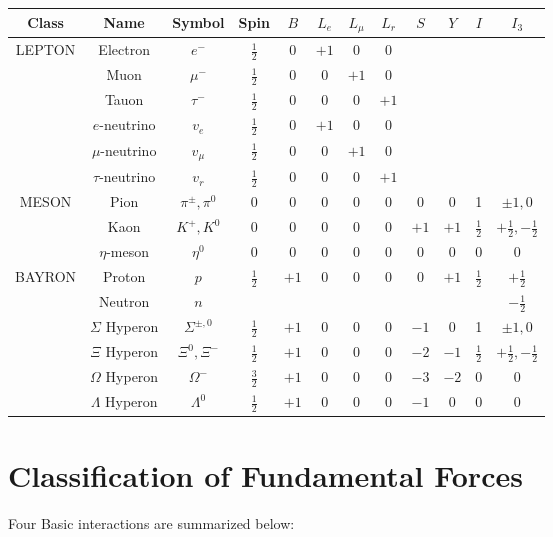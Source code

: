 \begin{tabular}{|c|c|c|c|c|c|c|c|c|c|c|c|}
	\hline
	Class & Name & Symbol & Spin & $B$ & $L_e$ & $L_\mu$ & $L_r$ & $S$ & $Y$ & $I$ & $I_3$	\\\hline
	\multirow{6}{*}{LEPTON}&Electron & $e^{-}$ & $\frac{1}{2}$ & 0 & $+1$ & 0 & 0&\multicolumn{4}{c|}{ }\\\cline{2-8}
	&Muon & $\mu^{-}$ & $\frac{1}{2}$ & 0 & 0 & $+1$ & 0 &\multicolumn{4}{c|}{ }\\\cline{2-8}
	 &Tauon & $\tau^{-}$ & $\frac{1}{2}$ & 0 & 0 & 0 & $+1$ &\multicolumn{4}{c|}{ }\\\cline{2-8}
	&$e$-neutrino & $v_e$ & $\frac{1}{2}$ & 0 & $+1$ & 0 & 0 &\multicolumn{4}{c|}{ }\\\cline{2-8}
	&$\mu$-neutrino & $v_{\mu }$ & $\frac{1}{2}$ & 0 & 0 & $+1$ & 0 &\multicolumn{4}{c|}{ }\\\cline{2-8}
	&$\tau$-neutrino & $v_r$ & $\frac{1}{2}$ & 0 & 0 & 0 & $+1$ &\multicolumn{4}{c|}{ }\\\hline
	\multirow{3}{*}{MESON}&Pion & $\pi^{\pm}, \pi^0$ & 0 & 0 & 0 & 0 & 0 & 0 & 0 & 1 & $\pm 1,0$ \\\cline{2-12}
	 &Kaon & $K^{+}, K^0$ & 0 & 0 & 0 & 0 & 0 & $+1$ & $+1$ & $\frac{1}{2}$ & $+\frac{1}{2},-\frac{1}{2}$ \\\cline{2-12}
	&$\eta$-meson & $\eta^0$ & 0 & 0 & 0 & 0 & 0 & 0 & 0 & 0 & 0 \\\hline
	\multirow{6}{*}{BAYRON}&Proton&$p$&\multirow{2}{*}{$\frac{1}{2}$}&\multirow{2}{*}{$+1$}& \multirow{2}{*}{0}&\multirow{2}{*}{0}&\multirow{2}{*}{0}&\multirow{2}{*}{0}&\multirow{2}{*}{$+1$}&\multirow{2}{*}{$\frac{1}{2}$} &        $+\frac{1}{2}$\\\cline{2-3}\cline{12-12}
	&Neutron&$n$& & & & & & & & &$-\frac{1}{2}$\\\cline{2-12}
	&$\Sigma$ Hyperon & $\Sigma^{\pm, 0}$ & $\frac{1}{2}$ & $+1$ & 0 & 0 & 0 & $-1$ & 0 & 1 & $\pm 1,0$ \\
	\cline{2-12}&$\Xi$ Hyperon & $\Xi^0, \Xi^{-}$ & $\frac{1}{2}$ & $+1$ & 0 & 0 & 0 & $-2$ & $-1$ & $\frac{1}{2}$ & $+\frac{1}{2},-\frac{1}{2}$ \\
	\cline{2-12}&$\Omega$ Hyperon & $\Omega^{-}$ & $\frac{3}{2}$ & $+1$ & 0 & 0 & 0 & $-3$ & $-2$ & 0 & 0 \\
	\cline{2-12}&$\Lambda$ Hyperon & $\Lambda^0$ & $\frac{1}{2}$ & $+1$ & 0 & 0 & 0 & $-1$ & 0 & 0 & 0\\\hline
\end{tabular}
\section{Classification of Fundamental Forces}
Four Basic interactions are summarized below:\\


